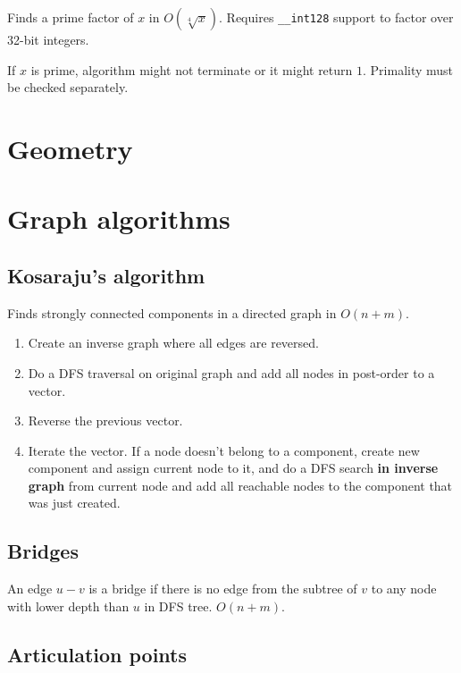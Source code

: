 \documentclass{article}
\begin{document}
Finds a prime factor of $x$ in $O(\sqrt[4]{x})$. Requires \verb|__int128| support to factor over 32-bit integers.

If $x$ is prime, algorithm might not terminate or it might return $1$. Primality must be checked separately.



\section {Geometry}



\section {Graph algorithms}

\subsection {Kosaraju's algorithm}

Finds strongly connected components in a directed graph in $O(n + m)$.

\begin{enumerate}
	\item Create an inverse graph where all edges are reversed.
	\item Do a DFS traversal on original graph and add all nodes in post-order to a vector.
	\item Reverse the previous vector.
	\item Iterate the vector. If a node doesn't belong to a component, create new component and assign current node to it, and do a DFS search \textbf{in inverse graph} from current node and add all reachable nodes to the component that was just created.
\end{enumerate}

\subsection {Bridges}

An edge $u-v$ is a bridge if there is no edge from the subtree of $v$ to any node with lower depth than $u$ in DFS tree. $O(n+m)$.



\subsection {Articulation points}
\end{document}
